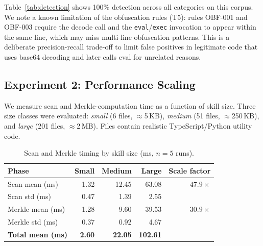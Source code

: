 \documentclass[11pt,twocolumn]{article}
\begin{document}
Table~\ref{tab:detection} shows 100\% detection across all categories on
this corpus. We note a known limitation of the obfuscation rules (T5): rules
OBF-001 and OBF-003 require the decode call and the \texttt{eval}/\texttt{exec}
invocation to appear within the same line, which may miss multi-line obfuscation
patterns. This is a deliberate precision-recall trade-off to limit false positives
in legitimate code that uses base64 decoding and later calls eval for unrelated
reasons.

\subsection{Experiment 2: Performance Scaling}

We measure scan and Merkle-computation time as a function of skill size.
Three size classes were evaluated: \emph{small} (6 files, $\approx$5\,KB),
\emph{medium} (51 files, $\approx$250\,KB), and \emph{large}
(201 files, $\approx$2\,MB). Files contain realistic TypeScript/Python
utility code.

\begin{table}[h]
\centering
\caption{Scan and Merkle timing by skill size (ms, $n=5$ runs).}
\label{tab:perf}
\renewcommand{\arraystretch}{1.1}
\scriptsize
\begin{tabular}{lrrrr}
\toprule
\textbf{Phase} & \textbf{Small} & \textbf{Medium} & \textbf{Large} & \textbf{Scale factor} \\
\midrule
Scan mean (ms)   & 1.32 & 12.45 & 63.08 & $47.9\times$ \\
Scan std (ms)    & 0.47 & 1.39  & 2.55  & \\
Merkle mean (ms) & 1.28 & 9.60  & 39.53 & $30.9\times$ \\
Merkle std (ms)  & 0.37 & 0.92  & 4.67  & \\
\textbf{Total mean (ms)} & \textbf{2.60} & \textbf{22.05} & \textbf{102.61} & \\
\bottomrule
\end{tabular}
\end{table}
\end{document}
